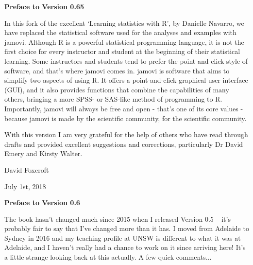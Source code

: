 

\newcommand{\vsp}{\vspace*{6pt}}

\begin{center}{\Large {\bf Preface to Version 0.65}}\end{center}
\vspace*{12pt}

\noindent
In this fork of the excellent `Learning statistics with R', by Danielle Navarro, we have replaced the statistical software used for the analyses and examples with jamovi. Although R is a powerful statistical programming language, it is not the first choice for every instructor and student at the beginning of their statistical learning. Some instructors and students tend to prefer the point-and-click style of software, and that's where jamovi comes in. jamovi is software that aims to simplify two aspects of using R. It offers a point-and-click graphical user interface (GUI), and it also provides functions that combine the capabilities of many others, bringing a more SPSS- or SAS-like method of programming to R. Importantly, jamovi will always be free and open - that's one of its core values - because jamovi is made by the scientific community, for the scientific community.

With this version I am very grateful for the help of others who have read through drafts and provided excellent suggestions and corrections, particularly Dr David Emery and Kirsty Walter.

\vspace*{24pt}
\noindent
David Foxcroft 

\noindent
July 1st, 2018

\vspace*{30pt}


\begin{center}{\Large {\bf Preface to Version 0.6}}\end{center}
\vspace*{12pt}

\noindent
The book hasn't changed much since 2015 when I released Version 0.5 -- it's probably fair to say that I've changed more than it has. I moved from Adelaide to Sydney in 2016 and my teaching profile at UNSW is different to what it was at Adelaide, and I haven't really had a chance to work on it since arriving here! It's a little strange looking back at this actually. A few quick comments...

